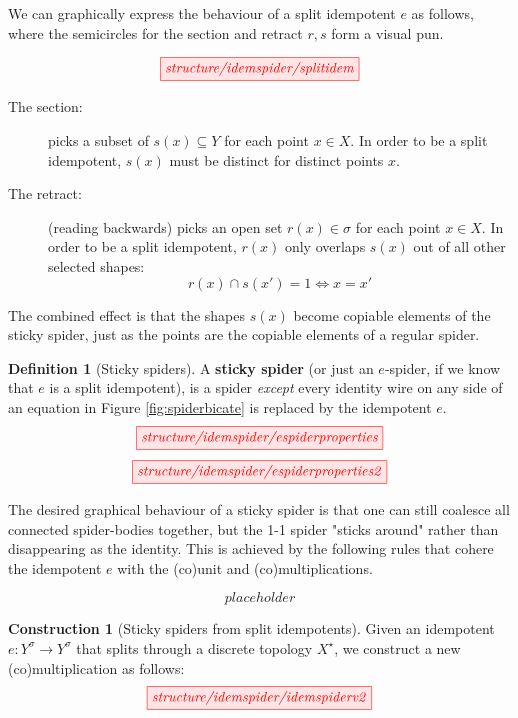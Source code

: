 \documentclass{tufte-handout}
\theoremstyle{definition}
\newtheorem{defn}[theorem]{Definition}
\newtheorem{construction}[theorem]{Construction}
\begin{document}
\begin{fullwidth}

 We can graphically express the behaviour of a split idempotent $e$ as follows, where the semicircles for the section and retract $r,s$ form a visual pun.

\[\scalebox{1}{\tikzfig{structure/idemspider/splitidem}}\]

\begin{description}
\item[The section:]{picks a subset of $s(x) \subseteq Y$ for each point $x \in X$. In order to be a split idempotent, $s(x)$ must be distinct for distinct points $x$.}
\item[The retract:]{(reading backwards) picks an open set $r(x) \in \sigma$ for each point $x \in X$. In order to be a split idempotent, $r(x)$ only overlaps $s(x)$ out of all other selected shapes: \[r(x) \cap s(x') = 1 \iff x = x'\]}
\end{description}
The combined effect is that the shapes $s(x)$ become copiable elements of the sticky spider, just as the points are the copiable elements of a regular spider.

\begin{defn}[Sticky spiders]
A \textbf{sticky spider} (or just an $e$-spider, if we know that $e$ is a split idempotent), is a spider \emph{except} every identity wire on any side of an equation in Figure \ref{fig:spiderbicate} is replaced by the idempotent $e$.
\[\scalebox{1}{\tikzfig{structure/idemspider/espiderproperties}}\]
\[\scalebox{1}{\tikzfig{structure/idemspider/espiderproperties2}}\]

The desired graphical behaviour of a sticky spider is that one can still coalesce all connected spider-bodies together, but the 1-1 spider "sticks around" rather than disappearing as the identity. This is achieved by the following rules that cohere the idempotent $e$ with the (co)unit and (co)multiplications.

\[placeholder\]
\end{defn}

\begin{construction}[Sticky spiders from split idempotents]
Given an idempotent $e: Y^\sigma \rightarrow Y^\sigma$ that splits through a discrete topology $X^\star$, we construct a new (co)multiplication as follows:
\[\scalebox{1}{\tikzfig{structure/idemspider/idemspiderv2}}\]
\end{construction}


\end{fullwidth}
\end{document}
